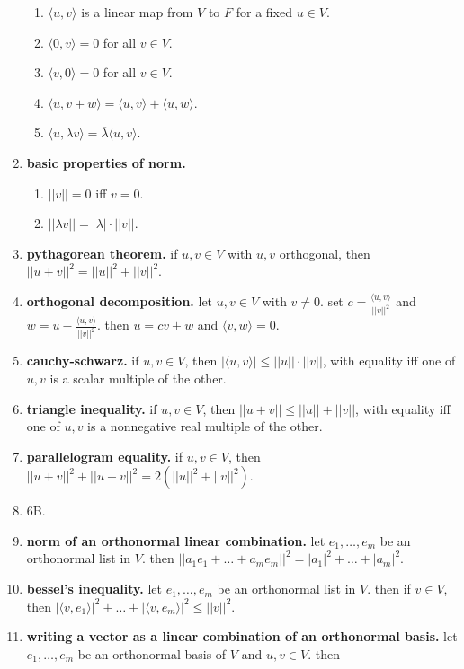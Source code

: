 \begin{enumerate}
	\begin{enumerate}
		\item $\langle u,v \rangle$ is a linear map from $V$ to $F$ for a fixed $u \in V$. 
		\item $\langle 0,v \rangle = 0$ for all $v \in V$. 
		\item $\langle v,0 \rangle = 0$ for all $v \in V$. 
		\item $\langle u,v+w \rangle = \langle u,v \rangle + \langle u,w \rangle$. 
		\item $\langle u,\lambda v \rangle = \overline{\lambda} \langle u,v \rangle$. 
	\end{enumerate}
	\item \textbf{basic properties of norm. } 
	\begin{enumerate}
		\item $||v||=0$ iff $v =0$. 
		\item $||\lambda v || = |\lambda| \cdot ||v||$.
	\end{enumerate}
	\item \textbf{pythagorean theorem. } if $u,v \in V$ with $u,v$ orthogonal, then $||u+v||^2 = ||u||^2 + ||v||^2$. 
	\item \textbf{orthogonal decomposition. } let $u,v \in V$ with $v \neq 0$. set $c = \frac{\langle u,v \rangle}{||v||^2}$ and $w = u - \frac{\langle u,v \rangle}{||v||^2}$. then $u=cv+w$ and $\langle v,w \rangle = 0$. 
	\item \textbf{cauchy-schwarz. } if $u,v \in V$, then $|\langle u,v \rangle| \leq ||u|| \cdot ||v||$, with equality iff one of $u,v$ is a scalar multiple of the other. 
	\item \textbf{triangle inequality. } if $u,v \in V$, then $||u+v|| \leq ||u|| + ||v||$, with equality iff one of $u,v$ is a nonnegative real multiple of the other. 
	\item \textbf{parallelogram equality. } if $u,v \in V$, then $||u+v||^2 + ||u-v||^2 = 2(||u||^2 + ||v||^2)$. 
	\item 6B. 
	\item \textbf{norm of an orthonormal linear combination. } let $e_1,\dots,e_m$ be an orthonormal list in $V$. then $||a_1e_1 + \dots + a_me_m||^2 = |a_1|^2 + \dots + |a_m|^2$. 
	\item \textbf{bessel's inequality. } let $e_1,\dots,e_m$ be an orthonormal list in $V$. then if $v \in V$, then $|\langle v,e_1 \rangle|^2 + \dots + |\langle v,e_m \rangle|^2 \leq ||v||^2$. 
	\item \textbf{writing a vector as a linear combination of an orthonormal basis. } let $e_1,\dots,e_m$ be an orthonormal basis of $V$ and $u,v \in V$. then 

\end{enumerate}
